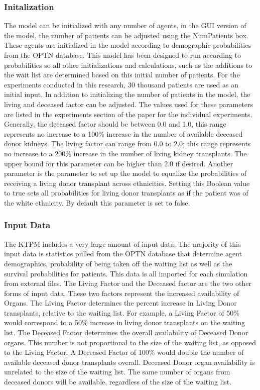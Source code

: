 \documentclass[9pt,a4paper,twocolumn]{scrartcl}
\begin{document}
\subsubsection{Initalization}
The model can be initialized with any number of agents, in the GUI version of the model, the number of patients can be adjusted using the NumPatients box.  These agents are initialized in the model according to demographic probabilities from the OPTN database.  This model has been designed to run according to probabilities so all other initializations and calculations, such as the additions to the wait list are determined based on this initial number of patients.  For the experiments conducted in this research, 30 thousand patients are used as an initial input.
In addition to initializing the number of patients in the model, the living and deceased factor can be adjusted.  The values used for these parameters are listed in the experiments section of the paper for the individual experiments.  Generally, the deceased factor should be between 0.0 and 1.0, this range represents no increase to a 100\% increase in the number of available deceased donor kidneys.  The living factor can range from 0.0 to 2.0; this range represents no increase to a 200\% increase in the number of living kidney transplants.  The upper bound for this parameter can be higher than 2.0 if desired.   
Another parameter is the parameter to set up the model to equalize the probabilities of receiving a living donor transplant across ethnicities.  Setting this Boolean value to true sets all probabilities for living donor transplants as if the patient was of the white ethnicity.  By default this parameter is set to false.

\subsubsection{Input Data}
The KTPM includes a very large amount of input data.  The majority of this input data is statistics pulled from the OPTN database that determine agent demographics, probability of being taken off the waiting list as well as the survival probabilities for patients.  This data is all imported for each simulation from external files. 
The Living Factor and the Deceased factor are the two other forms of input data.  These two factors represent the increased availability of Organs.  The Living Factor determines the percent increase in Living Donor transplants, relative to the waiting list.  For example, a Living Factor of 50\% would correspond to a 50\% increase in living donor transplants on the waiting list.  The Deceased Factor determines the overall availability of Deceased Donor organs.  This number is not proportional to the size of the waiting list, as opposed to the Living Factor.  A Deceased Factor of 100\% would double the number of available deceased donor transplants overall.  Deceased Donor organ availability is unrelated to the size of the waiting list.  The same number of organs from deceased donors will be available, regardless of the size of the waiting list.
\end{document}

